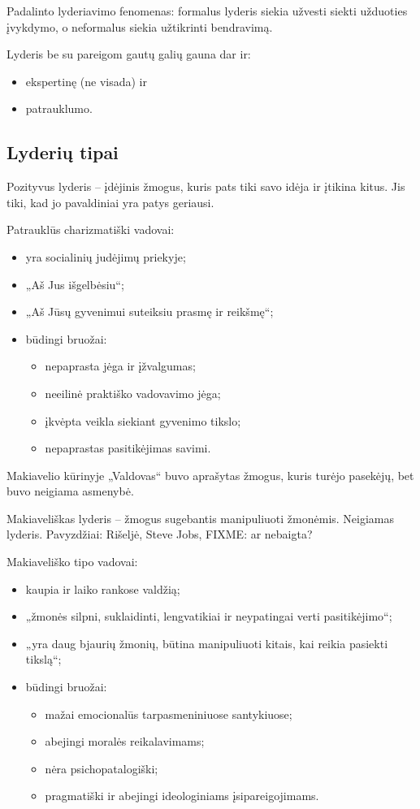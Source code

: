 Padalinto lyderiavimo fenomenas: formalus lyderis siekia užvesti siekti
užduoties įvykdymo, o neformalus siekia užtikrinti bendravimą.

Lyderis be su pareigom gautų galių gauna dar ir:
\begin{itemize}
  \item ekspertinę (ne visada) ir
  \item patrauklumo.
\end{itemize}

\subsection{Lyderių tipai}

Pozityvus lyderis – įdėjinis žmogus, kuris pats tiki savo idėja ir įtikina
kitus. Jis tiki, kad jo pavaldiniai yra patys geriausi.

Patrauklūs charizmatiški vadovai:
\begin{itemize}
  \item yra socialinių judėjimų priekyje;
  \item „Aš Jus išgelbėsiu“;
  \item „Aš Jūsų gyvenimui suteiksiu prasmę ir reikšmę“;
  \item būdingi bruožai:
    \begin{itemize}
      \item nepaprasta jėga ir įžvalgumas;
      \item neeilinė praktiško vadovavimo jėga;
      \item įkvėpta veikla siekiant gyvenimo tikslo;
      \item nepaprastas pasitikėjimas savimi.
    \end{itemize}
\end{itemize}

Makiavelio kūrinyje „Valdovas“ buvo aprašytas žmogus, kuris turėjo
pasekėjų, bet buvo neigiama asmenybė.

Makiaveliškas lyderis – žmogus sugebantis manipuliuoti žmonėmis.
Neigiamas lyderis. Pavyzdžiai: Rišeljė, Steve Jobs, FIXME: ar nebaigta?

Makiaveliško tipo vadovai:
\begin{itemize}
  \item kaupia ir laiko rankose valdžią;
  \item „žmonės silpni, suklaidinti, lengvatikiai ir neypatingai verti
    pasitikėjimo“;
  \item „yra daug bjaurių žmonių, būtina manipuliuoti kitais, kai reikia
    pasiekti tikslą“;
  \item būdingi bruožai:
    \begin{itemize}
      \item mažai emocionalūs tarpasmeniniuose santykiuose;
      \item abejingi moralės reikalavimams;
      \item nėra psichopatalogiški;
      \item pragmatiški ir abejingi ideologiniams įsipareigojimams.
    \end{itemize}
\end{itemize}

